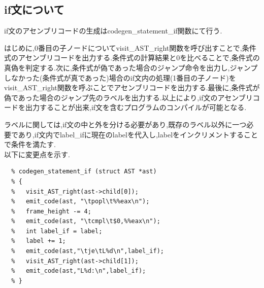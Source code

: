 \documentclass[10pt]{jsarticle}
\begin{document}
\subsection{if文について}
if文のアセンブリコードの生成はcodegen\_statement\_if関数にて行う.
\par はじめに,0番目の子ノードについてvisit\_AST\_right関数を呼び出すことで,条件式のアセンブリコードを出力する.条件式の計算結果と0を比べることで,条件式の真偽を判定する.次に,条件式が偽であった場合のジャンプ命令を出力し,ジャンプしなかった(条件式が真であった)場合のif文内の処理(1番目の子ノード)をvisit\_AST\_right関数を呼ぶことでアセンブリコードを出力する.最後に,条件式が偽であった場合のジャンプ先のラベルを出力する.以上により,if文のアセンブリコードを出力することが出来,if文を含むプログラムのコンパイルが可能となる.
\par ラベルに関しては,if文の中と外を分ける必要があり,既存のラベル以外に一つ必要であり,if文内でlabel\_ifに現在のlabelを代入し,labelをインクリメントすることで条件を満たす. \\
以下に変更点を示す.
\begin{lstlisting}[caption=codegen\_statement\_if関数]
  % static void
  % codegen_statement_if (struct AST *ast)
  % {
  %   visit_AST_right(ast->child[0]);
  %   emit_code(ast, "\tpopl\t%%eax\n");
  %   frame_height -= 4;
  %   emit_code(ast, "\tcmpl\t$0,%%eax\n");
  %   int label_if = label;
  %   label += 1;
  %   emit_code(ast,"\tje\tL%d\n",label_if);
  %   visit_AST_right(ast->child[1]);
  %   emit_code(ast,"L%d:\n",label_if);
  % }
\end{lstlisting}
\end{document}
